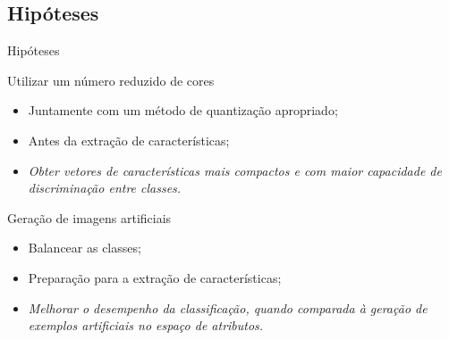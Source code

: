 \documentclass[10pt]{beamer}
\begin{document}
\subsection{Hipóteses}
\setlength\leftmargini{1em}
\begin{frame}{Hipóteses}
  \begin{block}{Utilizar um número reduzido de cores}
        \begin{itemize}
      \item Juntamente com um método de quantização apropriado;
      \item Antes da extração de características;
      \item \textit{Obter vetores de características mais compactos e com maior capacidade de discriminação entre classes.}
    \end{itemize}
  \end{block}
  \begin{block}{Geração de imagens artificiais}
        \begin{itemize}
      \item Balancear as classes;
      \item Preparação para a extração de características;
      \item \textit{Melhorar o desempenho da classificação, quando comparada à geração de exemplos artificiais no espaço de atributos.}
    \end{itemize}
  \end{block}
\end{frame}
\end{document}

